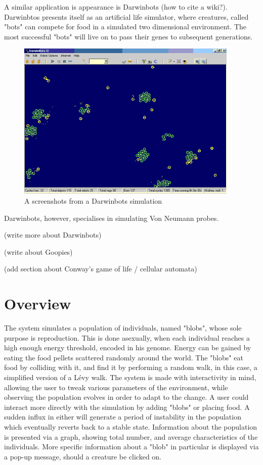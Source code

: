 A similar application is appearance is Darwinbots  (how to cite a wiki?). Darwinbtos presents itself as an artificial life simulator, where creatures, called "bots" can compete for food in a simulated two dimensional environment. The most successful "bots" will live on to pass their genes to subsequent generations.
\begin{figure}[!th]
	\centering
	\includegraphics[scale=1]{images/darwinbots}
	\caption{A screenshots from a Darwinbots simulation}
\end{figure}
Darwinbots, however, specialises in simulating Von Neumann probes.

(write more about Darwinbots)

(write about Goopies)

(add section about Conway's game of life / cellular automata)

\section{Overview}
The system simulates a population of individuals, named "blobs", whose sole purpose is reproduction. This is done asexually, when each individual reaches a high enough energy threshold, encoded in his genome. Energy can be gained by eating the food pellets scattered randomly around the world. The "blobs" eat food by colliding with it, and find it by performing a random walk, in this case, a simplified version of a L\'evy walk.
The system is made with interactivity in mind, allowing the user to tweak various parameters of the environment, while observing the population evolves in order to adapt to the change. A user could interact more directly with the simulation by adding "blobs" or placing food. A sudden influx in either will generate a period of instability in the population which eventually reverts back to a stable state.
Information about the population is presented via a graph, showing total number, and average characteristics of the individuals. More specific information about a "blob" in particular is displayed via a pop-up message, should a creature be clicked on.

